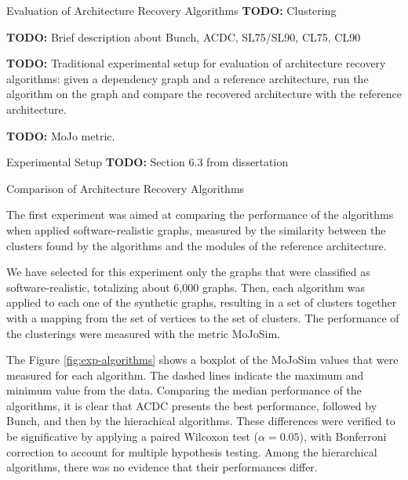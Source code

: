 \documentclass[11pt,twocolumn,a4paper,english]{article}
\newcommand{\TODO}{\textbf{TODO:} }
\begin{document}
\begin{section}{Evaluation of Architecture Recovery Algorithms}
	\TODO Clustering

	\TODO Brief description about Bunch, ACDC, SL75/SL90, CL75, CL90
	
	\TODO Traditional experimental setup for evaluation of architecture recovery algorithms: given a dependency graph and a reference architecture, run the algorithm on the graph and compare the recovered architecture with the reference architecture.
	
	\TODO MoJo metric.

\begin{subsection}{Experimental Setup}
	\TODO Section 6.3 from dissertation
\end{subsection}

\begin{subsection}{Comparison of Architecture Recovery Algorithms}
	
	The first experiment was aimed at comparing the performance of the algorithms when applied software-realistic graphs, measured by the similarity between the clusters found by the algorithms and the modules of the reference architecture.
	
	We have selected for this experiment only the graphs that were classified as software-realistic, totalizing about 6,000 graphs. Then, each algorithm was applied to each one of the synthetic graphs, resulting in a set of clusters together with a mapping from the set of vertices to the set of clusters. The performance of the clusterings were measured with the metric MoJoSim.
	
	The Figure \ref{fig:exp-algorithms} shows a boxplot of the MoJoSim values that were measured for each algorithm. The dashed lines indicate the maximum and minimum value from the data. Comparing the median performance of the algorithms, it is clear that ACDC presents the best performance, followed by Bunch, and then by the hierachical algorithms. These differences were verified to be significative by applying a paired Wilcoxon test ($\alpha = 0.05$), with Bonferroni correction to account for multiple hypothesis testing. Among the hierarchical algorithms, there was no evidence that their performances differ.
	

\end{subsection}
\end{section}
\end{document}
